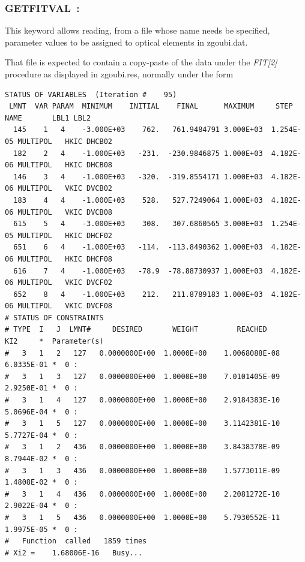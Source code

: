 {\newpage

\subsubsection{GETFITVAL~: \GETFITVALTitl} \label{GETFITVAL}  
\medskip

This keyword allows reading, 
from a file whose name needs be specified,  parameter values to be assigned to optical elements in zgoubi.dat. 

\bigskip

\noindent That file is expected to contain a copy-paste of the data under the \textsl{FIT[2]} procedure as 
displayed in zgoubi.res, normally under the form \\
\begin{center}
{\footnotesize
\begin{verbatim}
STATUS OF VARIABLES  (Iteration #    95)
 LMNT  VAR PARAM  MINIMUM    INITIAL    FINAL      MAXIMUM     STEP    NAME       LBL1 LBL2
  145    1   4    -3.000E+03    762.   761.9484791 3.000E+03  1.254E-05 MULTIPOL   HKIC DHCB02
  182    2   4    -1.000E+03   -231.  -230.9846875 1.000E+03  4.182E-06 MULTIPOL   HKIC DHCB08  
  146    3   4    -1.000E+03   -320.  -319.8554171 1.000E+03  4.182E-06 MULTIPOL   VKIC DVCB02  
  183    4   4    -1.000E+03    528.   527.7249064 1.000E+03  4.182E-06 MULTIPOL   VKIC DVCB08  
  615    5   4    -3.000E+03    308.   307.6860565 3.000E+03  1.254E-05 MULTIPOL   HKIC DHCF02  
  651    6   4    -1.000E+03   -114.  -113.8490362 1.000E+03  4.182E-06 MULTIPOL   HKIC DHCF08  
  616    7   4    -1.000E+03   -78.9  -78.88730937 1.000E+03  4.182E-06 MULTIPOL   VKIC DVCF02  
  652    8   4    -1.000E+03    212.   211.8789183 1.000E+03  4.182E-06 MULTIPOL   VKIC DVCF08  
# STATUS OF CONSTRAINTS
# TYPE  I   J  LMNT#     DESIRED       WEIGHT         REACHED         KI2     *  Parameter(s) 
#   3   1   2   127   0.0000000E+00  1.0000E+00    1.0068088E-08   6.0335E-01 *  0 : 
#   3   1   3   127   0.0000000E+00  1.0000E+00    7.0101405E-09   2.9250E-01 *  0 : 
#   3   1   4   127   0.0000000E+00  1.0000E+00    2.9184383E-10   5.0696E-04 *  0 : 
#   3   1   5   127   0.0000000E+00  1.0000E+00    3.1142381E-10   5.7727E-04 *  0 : 
#   3   1   2   436   0.0000000E+00  1.0000E+00    3.8438378E-09   8.7944E-02 *  0 : 
#   3   1   3   436   0.0000000E+00  1.0000E+00    1.5773011E-09   1.4808E-02 *  0 : 
#   3   1   4   436   0.0000000E+00  1.0000E+00    2.2081272E-10   2.9022E-04 *  0 : 
#   3   1   5   436   0.0000000E+00  1.0000E+00    5.7930552E-11   1.9975E-05 *  0 : 
#   Function  called   1859 times
# Xi2 =    1.68006E-16   Busy...
\end{verbatim}
}
\end{center}

}
